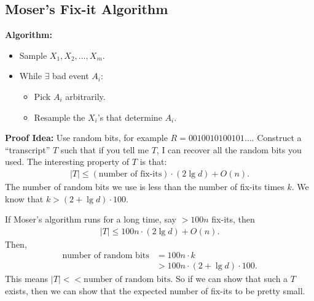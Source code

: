 \documentclass{report}
\begin{document}
\newpage
\subsection{Moser's Fix-it Algorithm}

\textbf{Algorithm:}
\begin{itemize}
    \item Sample $X_1, X_2, \ldots, X_m$.
    \item While $\exists$ bad event $A_i$:
    \begin{itemize}
        \item Pick $A_i$ arbitrarily.
        \item Resample the $X_i$'s that determine $A_i$.
    \end{itemize}
\end{itemize}

\noindent \textbf{Proof Idea:}
Use random bits, for example $R=0010010100101\ldots$. Construct a ``transcript'' $T$ such that if you tell me $T$, I can recover all the random bits you used. The interesting property of $T$ is that:
\begin{align*}
    |T| \leq (\text{number of fix-its}) \cdot (2 \lg d) + O(n).
\end{align*}
The number of random bits we use is less than the number of fix-its times $k$. We know that $k > (2 + \lg d) \cdot 100$. 

If Moser's algorithm runs for a long time, say $> 100n$ fix-its, then
\begin{align*}
    |T| \leq 100n \cdot (2 \lg d) + O(n).
\end{align*}
Then,
\begin{align*}
    \text{number of random bits} &= 100n \cdot k \\
    &> 100n \cdot (2 + \lg d) \cdot 100.
\end{align*}
This means $|T| << \text{number of random bits}$. So if we can show that such a $T$ exists, then we can show that the expected number of fix-its to be pretty small.
\end{document}
